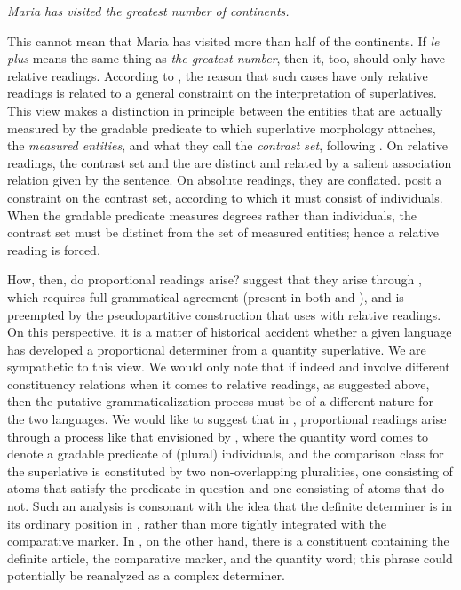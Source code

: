\documentclass[output=paper
,modfonts
,nonflat]{langsci/langscibook}
\begin{document}
\ea \label{ex:coppockstrand:109}
\textit{Maria has visited the greatest number of continents.}
\z 

This cannot mean that Maria has visited more than half of the continents. If \textit{le plus} means the same thing as \textit{the greatest number}, then it, too, should only have relative readings. According to \citet{CoppockEtAliiinprep}, the reason that such cases have only relative readings is related to a general constraint on the interpretation of superlatives. This view makes a distinction in principle between the entities that are actually measured by the gradable predicate to which superlative morphology attaches, the \textit{measured entities}, and what they call the \textit{contrast set}, following \citet{CoppockBeaver2014}. On relative readings, the contrast set and the  are distinct and related by a salient association relation given by the sentence. On absolute readings, they are conflated. \citet{CoppockEtAliiinprep} posit a constraint on the contrast set, according to which it must consist of individuals. When the gradable predicate measures degrees rather than individuals, the contrast set must be distinct from the set of measured entities; hence a relative reading is forced.

How, then, do proportional readings arise? \citet{Dobrovie-SorinGiurgea2015} suggest that they arise through , which requires full grammatical agreement (present in both  and ), and is preempted by the pseudopartitive construction that  uses with relative readings. On this perspective, it is a matter of historical accident whether a given language has developed a proportional determiner from a quantity superlative. We are sympathetic to this view. We would only note that if indeed  and  involve different constituency relations when it comes to relative readings, as suggested above, then the putative grammaticalization process must be of a different nature for the two languages. We would like to suggest that in , proportional readings arise through a process like that envisioned by \citet{Hoeksema1983}, where the quantity word comes to denote a gradable predicate of (plural) individuals, and the comparison class for the superlative is constituted by two non-overlapping pluralities, one consisting of atoms that satisfy the predicate in question and one consisting of atoms that do not. Such an analysis is consonant with the idea that the definite determiner is in its ordinary position in , rather than more tightly integrated with the comparative marker. In , on the other hand, there is a constituent containing the definite article, the comparative marker, and the quantity word; this phrase could potentially be reanalyzed as a complex determiner.
\end{document}
